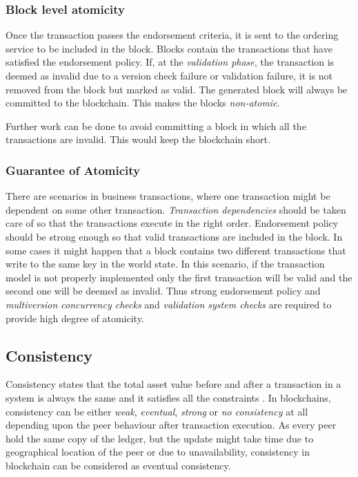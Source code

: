 \documentclass[
  a4paper,  %
  twoside,  %
  bibliography=totoc,
  headsepline,
  cleardoublepage=empty,
  parskip=half,
  draft=false
]{scrbook}
\begin{document}
\subsubsection{Block level atomicity}
Once the transaction passes the endorsement criteria, it is sent to the ordering service to be included in the block. Blocks contain the transactions that have satisfied the endorsement policy. If, at the \textit{validation phase}, the transaction is deemed as invalid due to a version check failure or validation failure, it is not removed from the block but marked as valid. The generated block will always be committed to the blockchain. This makes the blocks \textit{non-atomic}.

Further work can be done to avoid committing a block in which all the transactions are invalid. This would keep the blockchain short.

\subsubsection{Guarantee of Atomicity}
There are scenarios in business transactions, where one transaction might be dependent on some other transaction. \textit{Transaction dependencies} should be taken care of so that the transactions execute in the right order. Endorsement policy should be strong enough so that valid transactions are included in the block. In some cases it might happen that a block contains two different transactions that write to the same key in the world state. In this scenario, if the transaction model is not properly implemented only the first transaction will be valid and the second one will be deemed as invalid. Thus strong endorsement policy and \textit{multiversion concurrency checks} and \textit{validation system checks} are required to provide high degree of atomicity.


\subsection{Consistency}
Consistency states that the total asset value before and after a transaction in a system is always the same and it satisfies all the constraints \cite{Atomicity}. In blockchains, consistency can be either \textit{weak}, \textit{eventual}, \textit{strong} or \textit{no consistency} at all depending upon the peer behaviour after transaction execution. As every peer hold the same copy of the ledger, but the update might take time due to geographical location of the peer or due to unavailability, consistency in blockchain can be considered as eventual consistency.
\end{document}
